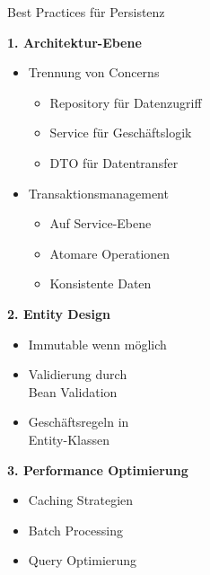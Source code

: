 \begin{KR}{Best Practices für Persistenz}

    \begin{minipage}[t]{0.5\textwidth}
\textbf{1. Architektur-Ebene}
\begin{itemize}
    \item Trennung von Concerns
    \begin{itemize}
        \item Repository für Datenzugriff
        \item Service für Geschäftslogik
        \item DTO für Datentransfer
    \end{itemize}
    \item Transaktionsmanagement
    \begin{itemize}
        \item Auf Service-Ebene
        \item Atomare Operationen
        \item Konsistente Daten
    \end{itemize}
\end{itemize}
\end{minipage}
\begin{minipage}[t]{0.5\textwidth}
\textbf{2. Entity Design}
\begin{itemize}
    \item Immutable wenn möglich
    \item Validierung durch\\ Bean Validation
    \item Geschäftsregeln in\\ Entity-Klassen
\end{itemize}

\textbf{3. Performance Optimierung}
\begin{itemize}
    \item Caching Strategien
    \item Batch Processing
    \item Query Optimierung
\end{itemize}
\end{minipage}
\end{KR}

